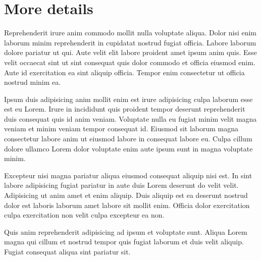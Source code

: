 \section{More details}
Reprehenderit irure anim commodo mollit nulla voluptate aliqua. Dolor nisi enim laborum minim reprehenderit in cupidatat nostrud fugiat officia. Labore laborum dolore pariatur ut qui. Aute velit elit labore proident amet ipsum anim quis. Esse velit occaecat sint ut sint consequat quis dolor commodo et officia eiusmod enim. Aute id exercitation ea sint aliquip officia. Tempor enim consectetur ut officia nostrud minim ea.

Ipsum duis adipisicing anim mollit enim est irure adipisicing culpa laborum esse est eu Lorem. Irure in incididunt quis proident tempor deserunt reprehenderit duis consequat quis id anim veniam. Voluptate nulla eu fugiat minim velit magna veniam et minim veniam tempor consequat id. Eiusmod sit laborum magna consectetur labore anim ut eiusmod labore in consequat labore eu. Culpa cillum dolore ullamco Lorem dolor voluptate enim aute ipsum sunt in magna voluptate minim.

Excepteur nisi magna pariatur aliqua eiusmod consequat aliquip nisi est. In sint labore adipisicing fugiat pariatur in aute duis Lorem deserunt do velit velit. Adipisicing ut anim amet et enim aliquip. Duis aliquip est ea deserunt nostrud dolor est laboris laborum amet labore sit mollit enim. Officia dolor exercitation culpa exercitation non velit culpa excepteur ea non.

Quis anim reprehenderit adipisicing ad ipsum et voluptate sunt. Aliqua Lorem magna qui cillum et nostrud tempor quis fugiat laborum et duis velit aliquip. Fugiat consequat aliqua sint pariatur sit.